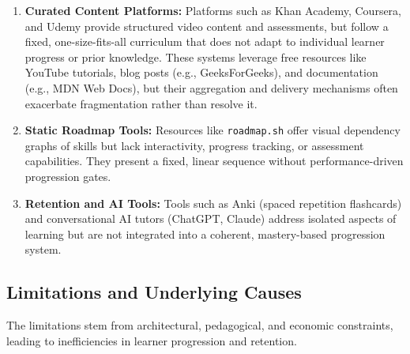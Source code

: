 \begin{enumerate}
    \item \textbf{Curated Content Platforms:} Platforms such as Khan Academy, Coursera, and Udemy provide structured video content and assessments, but follow a fixed, one-size-fits-all curriculum that does not adapt to individual learner progress or prior knowledge. These systems leverage free resources like YouTube tutorials, blog posts (e.g., GeeksForGeeks), and documentation (e.g., MDN Web Docs), but their aggregation and delivery mechanisms often exacerbate fragmentation rather than resolve it.
    \item \textbf{Static Roadmap Tools:} Resources like \texttt{roadmap.sh} offer visual dependency graphs of skills but lack interactivity, progress tracking, or assessment capabilities. They present a fixed, linear sequence without performance-driven progression gates.
    \item \textbf{Retention and AI Tools:} Tools such as Anki (spaced repetition flashcards) and conversational AI tutors (ChatGPT, Claude) address isolated aspects of learning but are not integrated into a coherent, mastery-based progression system.
\end{enumerate}

\subsection*{Limitations and Underlying Causes}

The limitations stem from architectural, pedagogical, and economic constraints, leading to inefficiencies in learner progression and retention.

